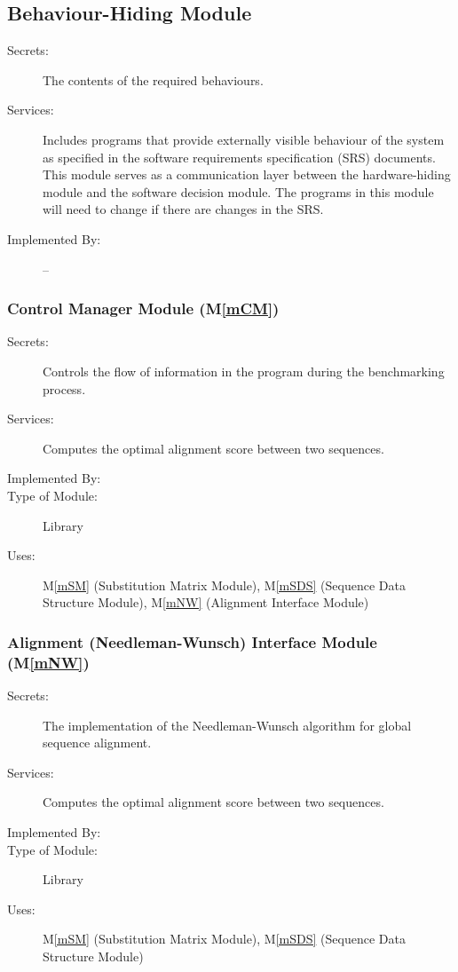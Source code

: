 \documentclass[12pt, titlepage]{article}
\newcommand{\mref}[1]{M\ref{#1}}
\begin{document}
\subsection{Behaviour-Hiding Module}

\begin{description}
\item[Secrets:]The contents of the required behaviours.
\item[Services:]Includes programs that provide externally visible behaviour of
  the system as specified in the software requirements specification (SRS)
  documents. This module serves as a communication layer between the
  hardware-hiding module and the software decision module. The programs in this
  module will need to change if there are changes in the SRS.
\item[Implemented By:] --
\end{description}

\subsubsection{Control Manager Module (\mref{mCM})}

\begin{description}
\item[Secrets:] Controls the flow of information in the program during the benchmarking process.
\item[Services:] Computes the optimal alignment score between two sequences.
\item[Implemented By:] \progname{}
\item[Type of Module:] Library
\item[Uses:] \mref{mSM} (Substitution Matrix Module), \mref{mSDS} (Sequence Data Structure Module), \mref{mNW} (Alignment Interface Module)
\end{description}


\subsubsection{Alignment (Needleman-Wunsch) Interface Module (\mref{mNW})}

\begin{description}
\item[Secrets:] The implementation of the Needleman-Wunsch algorithm for global sequence alignment.
\item[Services:] Computes the optimal alignment score between two sequences.
\item[Implemented By:] \progname{}
\item[Type of Module:] Library
\item[Uses:] \mref{mSM} (Substitution Matrix Module), \mref{mSDS} (Sequence Data Structure Module)
\end{description}
\end{document}
